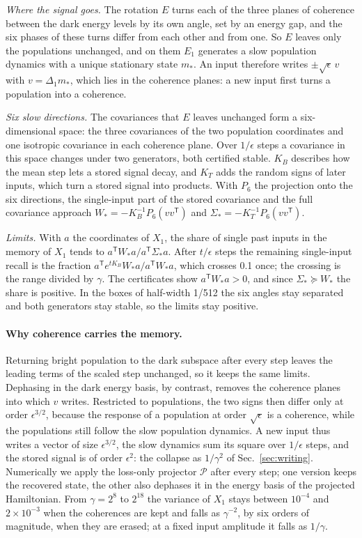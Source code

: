 \emph{Where the signal goes.} The rotation $E$ turns each of the three planes of coherence between the dark energy
levels by its own angle, set by an energy gap, and the six phases of these turns differ from each other and from one.
So $E$ leaves only the populations unchanged, and on them $E_1$ generates a slow population dynamics with a unique stationary state
$m_*$. An input therefore writes $\pm\sqrt\epsilon\,v$ with $v=\Delta_1m_*$, which lies in the coherence planes: a new
input first turns a population into a coherence.

\emph{Six slow directions.} The covariances that $E$ leaves unchanged form a six-dimensional space: the three
covariances of the two population coordinates and one isotropic covariance in each coherence plane. Over $1/\epsilon$
steps a covariance in this space changes under two generators, both certified stable. $K_B$ describes how the mean
step lets a stored signal decay, and $K_T$ adds the random signs of later inputs, which turn a stored signal into
products. With $P_6$ the projection onto the six directions, the single-input part of the stored covariance and the
full covariance approach $W_*=-K_B^{-1}P_6(vv^{\mathsf T})$ and $\Sigma_*=-K_T^{-1}P_6(vv^{\mathsf T})$.

\emph{Limits.} With $a$ the coordinates of $X_1$, the share of single past inputs in the memory of $X_1$ tends to
$a^{\mathsf T}W_*a/a^{\mathsf T}\Sigma_*a$. After $t/\epsilon$ steps the remaining single-input recall is the fraction
$a^{\mathsf T}e^{tK_B}W_*a/a^{\mathsf T}W_*a$, which crosses 0.1 once; the crossing is the range divided by $\gamma$.
The certificates show $a^{\mathsf T}W_*a>0$, and since $\Sigma_*\succeq W_*$ the share is positive. In the boxes of
half-width 1/512 the six angles stay separated and both generators stay stable, so the limits stay positive.

\paragraph{Why coherence carries the memory.}
Returning bright population to the dark subspace after every step leaves the leading terms of the scaled step
unchanged, so it keeps the same limits. Dephasing in the dark energy basis, by contrast, removes the coherence planes
into which $v$ writes. Restricted to populations, the two signs then differ only at order $\epsilon^{3/2}$, because the
response of a population at order $\sqrt\epsilon$ is a coherence, while the populations still follow the slow
population dynamics. A new input thus writes a vector of size $\epsilon^{3/2}$, the slow dynamics sum its square over
$1/\epsilon$ steps, and the stored signal is of order $\epsilon^2$: the collapse as $1/\gamma^2$ of
Sec.~\ref{sec:writing}. Numerically we apply the loss-only projector $\mathcal P$ after every step; one version keeps
the recovered state, the other also dephases it in the energy basis of the projected Hamiltonian. From $\gamma=2^8$
to $2^{18}$ the variance of $X_1$ stays between $10^{-4}$ and $2\times10^{-3}$ when the coherences are kept and falls
as $\gamma^{-2}$, by six orders of magnitude, when they are erased; at a fixed input amplitude it falls as
$1/\gamma$.

